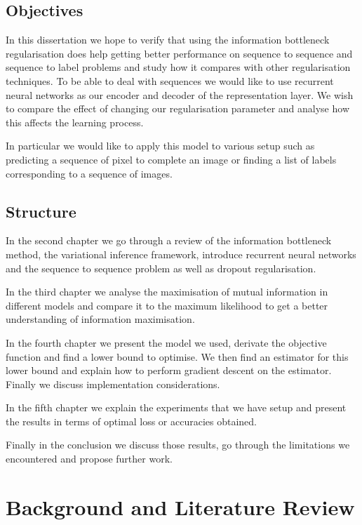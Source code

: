 \documentclass[11pt,oneside,openright]{report}
\begin{document}
\section{Objectives}
In this dissertation we hope to verify that using the information bottleneck regularisation does help getting better performance on sequence to sequence and sequence to label problems and study how it compares with other regularisation techniques. To be able to deal with sequences we would like to use recurrent neural networks as our encoder and decoder of the representation layer. We wish to compare the effect of changing our regularisation parameter and analyse how this affects the learning process. 

In particular we would like to apply this model to various setup such as predicting a sequence of pixel to complete an image or finding a list of labels corresponding to a sequence of images.

\section{Structure}

In the second chapter we go through a review of the information bottleneck method, the variational inference framework, introduce recurrent neural networks and the sequence to sequence problem as well as dropout regularisation.

In the third chapter we analyse the maximisation of mutual information in different models and compare it to the maximum likelihood to get a better understanding of information maximisation.

In the fourth chapter we present the model we used, derivate the objective function and find a lower bound to optimise. We then find an estimator for this lower bound and explain how to perform gradient descent on the estimator. Finally we discuss implementation considerations.

In the fifth chapter we explain the experiments that we have setup and present the results in terms of optimal loss or accuracies obtained.

Finally in the conclusion we discuss those results, go through the limitations we encountered and propose further work.

\chapter{Background and Literature Review}
\end{document}
